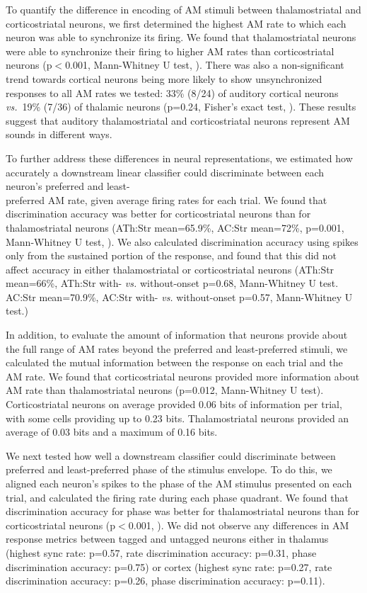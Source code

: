 To quantify the difference in encoding of AM stimuli between thalamostriatal and corticostriatal neurons, we first determined the highest AM rate to which each neuron was able to synchronize its firing.
%
We found that thalamostriatal neurons were able to synchronize their firing to higher AM rates than corticostriatal neurons (p$<$0.001, Mann-Whitney U test, \fig{\AMSync}).
%
There was also a non-significant trend towards cortical neurons being more likely to show unsynchronized responses to all AM rates we tested: 33\% (8/24) of auditory cortical neurons \emph{vs.}\ 19\% (7/36) of thalamic neurons (p=0.24, Fisher’s exact test, \fig{\AMPies}).
%
These results suggest that auditory thalamostriatal and corticostriatal neurons represent AM sounds in different ways.

To further address these differences in neural representations, we estimated how accurately a downstream linear classifier could discriminate between each neuron's preferred and least-\\preferred AM rate, given average firing rates for each trial.
%
We found that discrimination accuracy was better for corticostriatal neurons than for thalamostriatal neurons (ATh:Str mean=65.9\%, AC:Str mean=72\%, p=0.001, Mann-Whitney U test, \fig{\AMRateDiscrim}).
%
We also calculated discrimination accuracy using spikes only from the sustained portion of the response, and found that this did not affect accuracy in either thalamostriatal or corticostriatal neurons (ATh:Str mean=66\%, ATh:Str with- \emph{vs.} without-onset p=0.68, Mann-Whitney U test. AC:Str mean=70.9\%, AC:Str with- \emph{vs.} without-onset p=0.57, Mann-Whitney U test.)

In addition, to evaluate the amount of information that neurons provide about the full range of AM rates beyond the preferred and least-preferred stimuli, we calculated the mutual information between the response on each trial and the AM rate.
%
We found that corticostriatal neurons provided more information about AM rate than thalamostriatal neurons  (p=0.012, Mann-Whitney U test).
%
Corticostriatal neurons on average provided 0.06 bits of information per trial, with some cells providing up to 0.23 bits. 
%
Thalamostriatal neurons provided an average of 0.03 bits and a maximum of 0.16 bits.
%

We next tested how well a downstream classifier could discriminate between preferred and least-preferred phase of the stimulus envelope.
%
To do this, we aligned each neuron's spikes to the phase of the AM stimulus presented on each trial, and calculated the firing rate during each phase quadrant. 
%
We found that discrimination accuracy for phase was better for thalamostriatal neurons than for corticostriatal neurons (p$<$0.001, \fig{\AMPhaseDiscrim}).
%
We did not observe any differences in AM response metrics between tagged and untagged neurons either in thalamus (highest sync rate: p=0.57, rate discrimination accuracy: p=0.31, phase discrimination accuracy: p=0.75) or cortex (highest sync rate: p=0.27, rate discrimination accuracy: p=0.26, phase discrimination accuracy: p=0.11).


